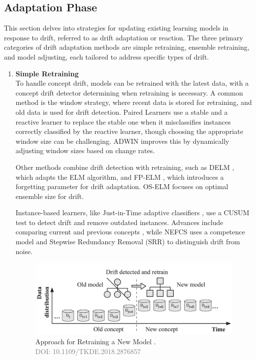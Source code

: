 \subsection{Adaptation Phase}
This section delves into strategies for updating existing learning models in response to drift, referred to as drift adaptation or reaction. The three primary categories of drift adaptation methods are simple retraining, ensemble retraining, and model adjusting, each tailored to address specific types of drift.

\begin{enumerate}[label=\Alph*.]
    \item \textbf{Simple Retraining} \\
    To handle concept drift, models can be retrained with the latest data, with a concept drift detector determining when retraining is necessary. A common method is the window strategy, where recent data is stored for retraining, and old data is used for drift detection. Paired Learners \cite{bach2008paired} use a stable and a reactive learner to replace the stable one when it misclassifies instances correctly classified by the reactive learner, though choosing the appropriate window size can be challenging. ADWIN \cite{bifet2007learning} improves this by dynamically adjusting window sizes based on change rates.

Other methods combine drift detection with retraining, such as DELM \cite{xu2017dynamic}, which adapts the ELM algorithm, and FP-ELM \cite{liu2016fp}, which introduces a forgetting parameter for drift adaptation. OS-ELM \cite{soares2016adaptive} focuses on optimal ensemble size for drift.

Instance-based learners, like Just-in-Time adaptive classifiers \cite{alippi2008just}, use a CUSUM test \cite{manly2000cumulative} to detect drift and remove outdated instances. Advances include comparing current and previous concepts \cite{silva2013data, alippi2008just}, while NEFCS \cite{lu2016concept} uses a competence model and Stepwise Redundancy Removal (SRR) \cite{lu2016concept} to distinguish drift from noise.
    

\begin{figure}[!ht]
    \centering
    \includegraphics[width=.9\textwidth]{2_Background/figures/retrain.png}
    \caption{Approach for Retraining a New Model \cite{8496795}. \\ \textcolor{gray}{\fontsize{10}{0}\selectfont DOI: 10.1109/TKDE.2018.2876857}}
    \label{fig:concept-drift-adaptation}
\end{figure}






\end{enumerate}
